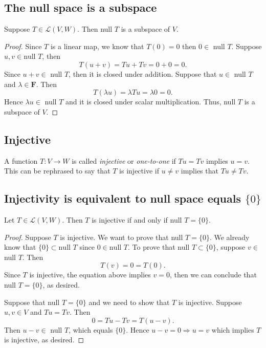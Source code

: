 \documentclass[11pt]{article}
\begin{document}
    \subsection{The null space is a subspace}

    Suppose \(T \in \mathcal{L}(V,W)\). Then null \(T\) is a subspace of $V$.

    \begin{proof}
        Since $T$ is a linear map, we know that \(T(0) = 0\) then \(0 \in\) null $T$.  Suppose $u,v \in \text{null } T$, then \[ T(u+v) = Tu + Tv = 0 + 0 = 0. \] Since \(u+v \in \) null $T$, then it is closed under addition. Suppose that \(u \in \) null $T$ and \(\lambda \in \textbf{F}\). Then \[ T(\lambda u) = \lambda Tu = \lambda 0 = 0. \] Hence \(\lambda u \in \) null $T$ and it is closed under scalar multiplication. Thus, null $T$ is a subspace of $V$. 
    \end{proof}

    \subsection{Injective}

    A function \(T:V \rightarrow W\) is called \emph{injective} or \emph{one-to-one} if \(Tu = Tv\) implies \(u = v\). This can be rephrased to say that $T$ is injective if \(u \neq v\) implies that \(Tu \neq Tv\). 

    \subsection{Injectivity is equivalent to null space equals \(\{0\}\)}

    Let \(T \in \mathcal{L}(V,W)\). Then $T$ is injective if and only if null $T = \{0\}$.

    \begin{proof}
        Suppose $T$ is injective. We want to prove that null $T = \{ 0 \}$. We already know that \(\{0\} \subset \text{null } T\) since \(0 \in \text{null } T\). To prove that null \(T \subset \{0\}\), suppose \(v \in\) null $T$. Then \[ T(v) = 0 = T(0). \] Since $T$ is injective, the equation above implies $v = 0$, then we can conclude that null \(T = \{0\}\), as desired.

        Suppose that null \(T = \{0\}\) and we need to show that $T$ is injective. Suppose \(u,v \in V\) and \(Tu = Tv\). Then \[0 = Tu - Tv = T(u-v).\] Then \(u - v \in \) null $T$, which equals \(\{0\}\). Hence \(u - v = 0 \Rightarrow u = v\) which implies $T$ is injective, as desired. 
    \end{proof}
\end{document}
